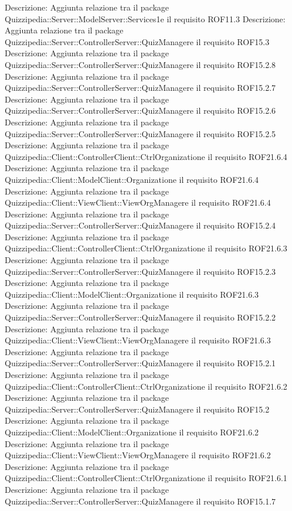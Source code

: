 Descrizione: Aggiunta relazione tra il package Quizzipedia::Server::ModelServer::Services1e il requisito ROF11.3 
Descrizione: Aggiunta relazione tra il package Quizzipedia::Server::ControllerServer::QuizManagere il requisito ROF15.3 
Descrizione: Aggiunta relazione tra il package Quizzipedia::Server::ControllerServer::QuizManagere il requisito ROF15.2.8 
Descrizione: Aggiunta relazione tra il package Quizzipedia::Server::ControllerServer::QuizManagere il requisito ROF15.2.7 
Descrizione: Aggiunta relazione tra il package Quizzipedia::Server::ControllerServer::QuizManagere il requisito ROF15.2.6 
Descrizione: Aggiunta relazione tra il package Quizzipedia::Server::ControllerServer::QuizManagere il requisito ROF15.2.5 
Descrizione: Aggiunta relazione tra il package Quizzipedia::Client::ControllerClient::CtrlOrganizatione il requisito ROF21.6.4 
Descrizione: Aggiunta relazione tra il package Quizzipedia::Client::ModelClient::Organizatione il requisito ROF21.6.4 
Descrizione: Aggiunta relazione tra il package Quizzipedia::Client::ViewClient::ViewOrgManagere il requisito ROF21.6.4 
Descrizione: Aggiunta relazione tra il package Quizzipedia::Server::ControllerServer::QuizManagere il requisito ROF15.2.4 
Descrizione: Aggiunta relazione tra il package Quizzipedia::Client::ControllerClient::CtrlOrganizatione il requisito ROF21.6.3 
Descrizione: Aggiunta relazione tra il package Quizzipedia::Server::ControllerServer::QuizManagere il requisito ROF15.2.3 
Descrizione: Aggiunta relazione tra il package Quizzipedia::Client::ModelClient::Organizatione il requisito ROF21.6.3 
Descrizione: Aggiunta relazione tra il package Quizzipedia::Server::ControllerServer::QuizManagere il requisito ROF15.2.2 
Descrizione: Aggiunta relazione tra il package Quizzipedia::Client::ViewClient::ViewOrgManagere il requisito ROF21.6.3 
Descrizione: Aggiunta relazione tra il package Quizzipedia::Server::ControllerServer::QuizManagere il requisito ROF15.2.1 
Descrizione: Aggiunta relazione tra il package Quizzipedia::Client::ControllerClient::CtrlOrganizatione il requisito ROF21.6.2 
Descrizione: Aggiunta relazione tra il package Quizzipedia::Server::ControllerServer::QuizManagere il requisito ROF15.2 
Descrizione: Aggiunta relazione tra il package Quizzipedia::Client::ModelClient::Organizatione il requisito ROF21.6.2 
Descrizione: Aggiunta relazione tra il package Quizzipedia::Client::ViewClient::ViewOrgManagere il requisito ROF21.6.2 
Descrizione: Aggiunta relazione tra il package Quizzipedia::Client::ControllerClient::CtrlOrganizatione il requisito ROF21.6.1 
Descrizione: Aggiunta relazione tra il package Quizzipedia::Server::ControllerServer::QuizManagere il requisito ROF15.1.7 
